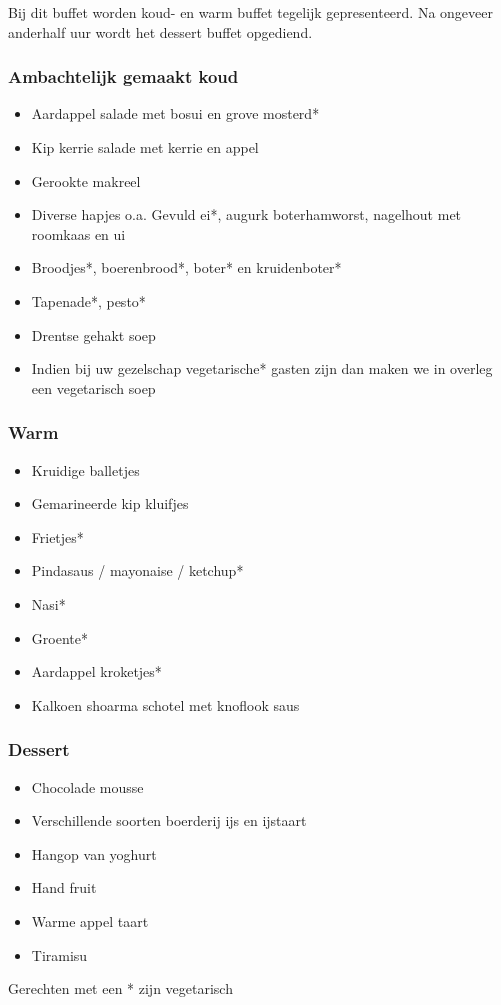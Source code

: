 Bij dit buffet worden koud- en warm buffet tegelijk gepresenteerd. 
Na ongeveer anderhalf uur wordt het dessert buffet opgediend.

\subsubsection*{Ambachtelijk gemaakt koud}
\begin{itemize}
	\item	Aardappel salade met bosui en grove mosterd*
	\item	Kip kerrie salade met kerrie en appel
	\item	Gerookte makreel
	\item	 Diverse hapjes o.a. Gevuld ei*, augurk boterhamworst, nagelhout met roomkaas en ui
	\item	Broodjes*, boerenbrood*, boter* en kruidenboter*
	\item	Tapenade*, pesto*
	\item	Drentse gehakt soep
\item	Indien bij uw gezelschap vegetarische* gasten zijn dan maken we in overleg een vegetarisch soep
\end{itemize}

\subsubsection*{Warm}
\begin{itemize}
	\item	Kruidige balletjes
	\item	Gemarineerde kip kluifjes
	\item	Frietjes*
	\item	Pindasaus / mayonaise / ketchup*
	\item	Nasi*
	\item	Groente*
	\item	Aardappel kroketjes*
	\item Kalkoen shoarma schotel met knoflook saus
\end{itemize}

\subsubsection*{Dessert}
\begin{itemize}
	\item	Chocolade mousse
	\item	Verschillende soorten boerderij ijs en ijstaart
	\item	Hangop van yoghurt
	\item	Hand fruit
	\item	Warme appel taart
	\item	Tiramisu
\end{itemize}

Gerechten met een * zijn vegetarisch
